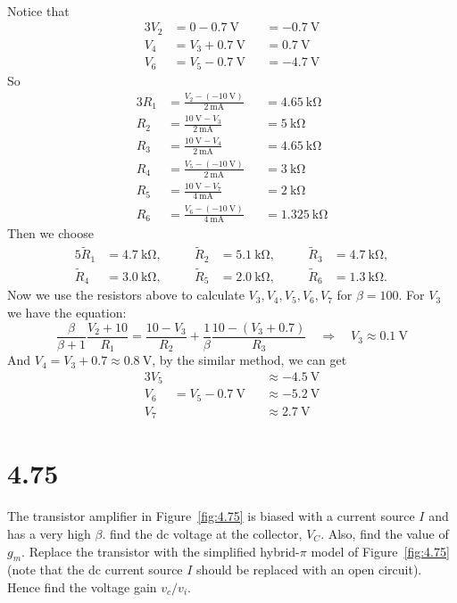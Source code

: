 \documentclass[12pt, a4paper]{article}
\begin{document}
\Ans \\
Notice that 
\begin{alignat*}{3}
  V_2 &= 0 - \SI{0.7}\V && = \SI{-0.7}{\V} \\
  V_4 &= V_3 + \SI{0.7}\V &&= \SI{0.7}\V \\
  V_6 &= V_5 - \SI{0.7}\V &&= \SI{-4.7}\V
\end{alignat*}
So 
\begin{alignat*}{3}
  R_1 &= \frac{V_2 - (\SI{-10}\V)}{\SI{2}\mA} &&= \SI{4.65}\kohm \\
  R_2 &= \frac{\SI{10}\V - V_3}{\SI{2}\mA} &&= \SI{5}\kohm \\
  R_3 &= \frac{\SI{10}\V - V_4}{\SI{2}\mA} &&= \SI{4.65}\kohm \\
  R_4 &= \frac{V_5 - (\SI{-10}\V)}{\SI{2}\mA} &&= \SI{3}\kohm \\
  R_5 &= \frac{\SI{10}\V - V_7}{\SI{4}\mA} &&= \SI{2}\kohm \\
  R_6 &= \frac{V_6 - (\SI{-10}\V)}{\SI{4}\mA} &&= \SI{1.325}\kohm
\end{alignat*}
Then we choose
\begin{alignat*}{5}
  \widetilde{R}_1 &= \SI{4.7}\kohm, && \quad \widetilde{R}_2 &= \SI{5.1}\kohm, && \quad \widetilde{R}_3 &= \SI{4.7}\kohm, \\
  \widetilde{R}_4 &= \SI{3.0}\kohm, && \quad \widetilde{R}_5 &= \SI{2.0}\kohm, && \quad \widetilde{R}_6 &= \SI{1.3}\kohm.
\end{alignat*}
Now we use the resistors above to calculate $V_3, V_4, V_5, V_6, V_7$
for $\beta = 100$.
For $V_3$ we have the equation:
\[
  \frac{\beta}{\beta+1}\frac{V_2 + 10}{R_1} = \frac{10 - V_3}{R_2}
  + \frac{1}{\beta}\frac{10 - (V_3 + 0.7)}{R_3}
  \quad \Rightarrow \quad V_3 \approx \SI{0.1}{\V}
\]
And $V_4 = V_3 + 0.7 \approx \SI{0.8}{\V}$, by the similar method, we can get
\begin{alignat*}{3}
  V_5 & && \approx \SI{-4.5}{\V} \\
  V_6 &= V_5 - \SI{0.7}{\V} && \approx \SI{-5.2}{\V} \\
  V_7 & && \approx \SI{2.7}{\V}
\end{alignat*}

\section{4.75}
The transistor amplifier in Figure~\ref{fig:4.75} is biased with a current source $I$ and has a very high $\beta$. find the dc voltage at the collector, $V_C$. Also, find the value of $g_m$. Replace the transistor with the simplified hybrid-$\pi$ model of Figure~\ref{fig:4.75} (note that the dc current source $I$ should be replaced with an open circuit). Hence find the voltage gain $v_c/v_i$. 
\end{document}
